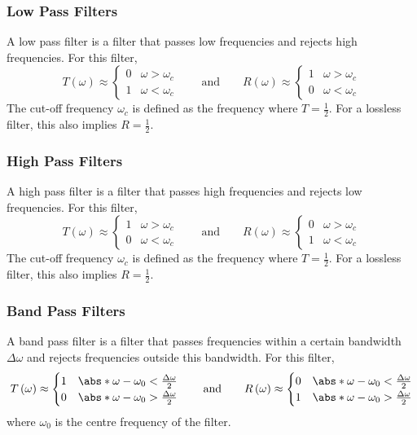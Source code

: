 \documentclass{article}
\begin{document}
\subsubsection{Low Pass Filters}
A low pass filter is a filter that passes low frequencies and rejects
high frequencies. For this filter,
\begin{equation*}
    T\left( \omega \right) \approx \begin{cases}
        0 & \omega > \omega_c \\
        1 & \omega < \omega_c
    \end{cases}
    \qquad \text{and} \qquad
    R\left( \omega \right) \approx \begin{cases}
        1 & \omega > \omega_c \\
        0 & \omega < \omega_c
    \end{cases}
\end{equation*}
The cut-off frequency \(\omega_c\) is defined as the frequency where
\(T = \frac{1}{2}\). For a lossless filter, this also implies
\(R = \frac{1}{2}\).
\subsubsection{High Pass Filters}
A high pass filter is a filter that passes high frequencies and rejects
low frequencies. For this filter,
\begin{equation*}
    T\left( \omega \right) \approx \begin{cases}
        1 & \omega > \omega_c \\
        0 & \omega < \omega_c
    \end{cases}
    \qquad \text{and} \qquad
    R\left( \omega \right) \approx \begin{cases}
        0 & \omega > \omega_c \\
        1 & \omega < \omega_c
    \end{cases}
\end{equation*}
The cut-off frequency \(\omega_c\) is defined as the frequency where
\(T = \frac{1}{2}\). For a lossless filter, this also implies
\(R = \frac{1}{2}\).
\subsubsection{Band Pass Filters}
A band pass filter is a filter that passes frequencies within a certain
bandwidth \(\Delta{\omega}\) and rejects frequencies outside this
bandwidth. For this filter,
\begin{equation*}
    T\left( \omega \right) \approx \begin{cases}
        1 & \abs*{\omega - \omega_0} < \frac{\Delta{\omega}}{2} \\
        0 & \abs*{\omega - \omega_0} > \frac{\Delta{\omega}}{2}
    \end{cases}
    \qquad \text{and} \qquad
    R\left( \omega \right) \approx \begin{cases}
        0 & \abs*{\omega - \omega_0} < \frac{\Delta{\omega}}{2} \\
        1 & \abs*{\omega - \omega_0} > \frac{\Delta{\omega}}{2}
    \end{cases}
\end{equation*}
where \(\omega_0\) is the centre frequency of the filter.
\end{document}
